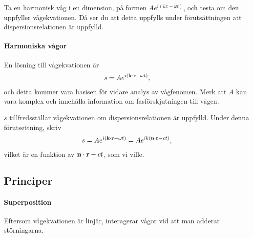 \deriv
Ta en harmonisk våg i en dimension, på formen $Ae^{i(kx - \omega t)}$, och testa om den uppfyller vågekvationen. Då ser du att detta uppfylls under förutsättningen att dispersionsrelationen är uppfylld.

\paragraph{Harmoniska vågor}
En lösning till vågekvationen är
\begin{align*}
	s = Ae^{i(\vect{k}\cdot\vect{r} - \omega t)},
\end{align*}
och detta kommer vara basisen för vidare analys av vågfenomen. Merk att $A$ kan vara komplex och innehålla information om fasförskjutningen till vågen.

\deriv
$s$ tillfredsställar vågekvationen om dispersionsrelationen är uppfylld. Under denna förutsettning, skriv
\begin{align*}
	s = Ae^{i(\vect{k}\cdot\vect{r} - \omega t)} = Ae^{ik(\vect{n}\cdot\vect{r} - ct)},
\end{align*}
vilket är en funktion av $\vect{n}\cdot\vect{r} - ct$, som vi ville.

\subsection{Principer}

\paragraph{Superposition}
Eftersom vågekvationen är linjär, interagerar vågor vid att man adderar störningarna.